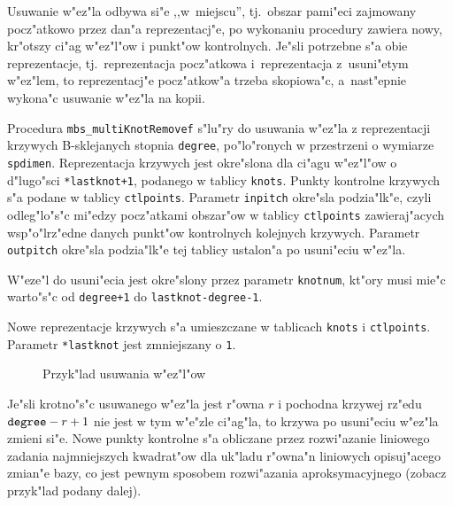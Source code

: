 Usuwanie w"ez"la odbywa si"e ,,w~miejscu'', tj.\ obszar pami"eci zajmowany
pocz"atkowo przez dan"a reprezentacj"e, po wykonaniu procedury zawiera nowy,
kr"otszy ci"ag w"ez"l"ow i punkt"ow kontrolnych. Je"sli potrzebne s"a obie
reprezentacje, tj.\ reprezentacja pocz"atkowa i~reprezentacja z~usuni"etym
w"ez"lem, to reprezentacj"e pocz"atkow"a trzeba skopiowa"c, a~nast"epnie
wykona"c usuwanie w"ez"la na kopii.

\vspace{\bigskipamount}
\begin{sloppypar}
Procedura \texttt{mbs\_multiKnotRemovef} s"lu"ry do
usuwania w"ez"la z reprezentacji krzywych B-sklejanych stopnia
\texttt{degree}, po"lo"ronych w przestrzeni o wymiarze \texttt{spdimen}.
Reprezentacja krzywych jest okre"slona dla ci"agu w"ez"l"ow o d"lugo"sci
\texttt{*lastknot+1}, podanego w tablicy \texttt{knots}.
Punkty kontrolne krzywych s"a podane w tablicy \texttt{ctlpoints}.
Parametr \texttt{inpitch} okre"sla podzia"lk"e, czyli odleg"lo"s"c mi"edzy
pocz"atkami obszar"ow w tablicy \texttt{ctlpoints} zawieraj"acych
wsp"o"lrz"edne danych punkt"ow kontrolnych kolejnych krzywych. Parametr
\texttt{outpitch} okre"sla podzia"lk"e tej tablicy ustalon"a po
usuni"eciu w"ez"la.
\end{sloppypar}

W"eze"l do usuni"ecia jest okre"slony przez parametr \texttt{knotnum},
kt"ory musi mie"c warto"s"c od \texttt{degree+1} do
\texttt{lastknot-degree-1}.

Nowe reprezentacje krzywych s"a umieszczane w tablicach \texttt{knots} i
\texttt{ctlpoints}. Parametr \texttt{*lastknot} jest zmniejszany o
\texttt{1}.

\begin{figure}[b]
  \centerline{}
  \caption{\label{fig:knotrem}Przyk"lad usuwania w"ez"l"ow}
\end{figure}
Je"sli krotno"s"c usuwanego w"ez"la jest r"owna $r$ i pochodna krzywej
rz"edu $\mbox{\texttt{degree}}-r+1$ nie jest w tym w"e"zle ci"ag"la, to
krzywa po usuni"eciu w"ez"la zmieni si"e. Nowe punkty kontrolne s"a
obliczane przez rozwi"azanie liniowego zadania najmniejszych kwadrat"ow dla
uk"ladu r"owna"n liniowych opisuj"acego zmian"e bazy, co jest pewnym
sposobem rozwi"azania aproksymacyjnego (zobacz przyk"lad podany dalej).

